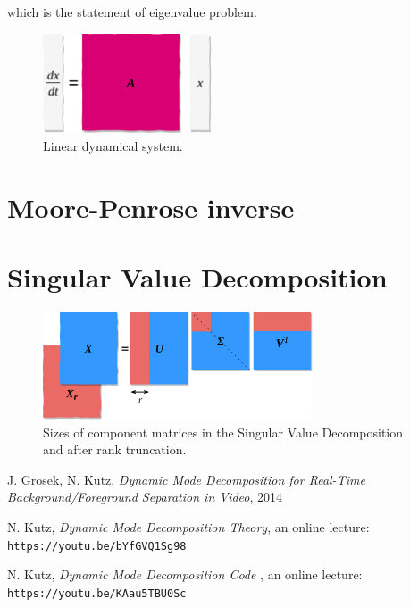 \documentclass[10pt,twocolumn]{article}
\begin{document}
which is the statement of eigenvalue problem.



\begin{figure}[H]
\centering\includegraphics[width=5cm]{lin-dyn.png}
\caption{Linear dynamical system.}
\label{fig:linear_system}
\end{figure}










\section{Moore-Penrose inverse} \label{app:B}




\section{Singular Value Decomposition} \label{app:C}


\begin{figure}[H]
\centering\includegraphics[width=8cm]{svd.png}
\caption{Sizes of component matrices in the Singular Value Decomposition and after rank truncation.}
\label{fig:linear_system}
\end{figure}


\thebibliography{}

 J. Grosek, N. Kutz, \textit{Dynamic Mode Decomposition for Real-Time Background/Foreground Separation in Video}, 2014

 N. Kutz, \textit{Dynamic Mode Decomposition Theory}, an online lecture: \verb|https://youtu.be/bYfGVQ1Sg98| \label{bib:kutz_1}

 N. Kutz, \textit{Dynamic Mode Decomposition Code }, an online lecture: \verb|https://youtu.be/KAau5TBU0Sc| \label{bib:kutz_2}
\end{document}
